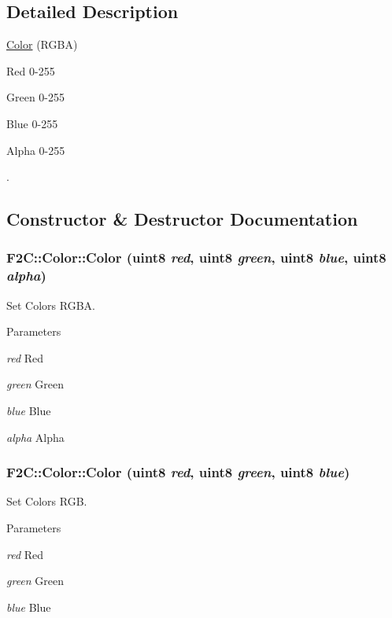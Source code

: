 \subsection{Detailed Description}
\hyperlink{class_f2_c_1_1_color}{Color} (RGBA) \par
 Red 0-\/255 \par
 Green 0-\/255 \par
 Blue 0-\/255 \par
 Alpha 0-\/255 \par
. 

\subsection{Constructor \& Destructor Documentation}
\hypertarget{class_f2_c_1_1_color_ad8f8599fb81eba93868f609a7557ec03}{
\subsubsection[{Color}]{\setlength{\rightskip}{0pt plus 5cm}F2C::Color::Color ({\bf uint8} {\em red}, \/  {\bf uint8} {\em green}, \/  {\bf uint8} {\em blue}, \/  {\bf uint8} {\em alpha})}}
\label{class_f2_c_1_1_color_ad8f8599fb81eba93868f609a7557ec03}


Set Colors RGBA. 
\begin{DoxyParams}{Parameters}
\item[{\em red}]Red \item[{\em green}]Green \item[{\em blue}]Blue \item[{\em alpha}]Alpha \end{DoxyParams}
\hypertarget{class_f2_c_1_1_color_a0e32e8fec1455104a63acf62cffc1891}{
\subsubsection[{Color}]{\setlength{\rightskip}{0pt plus 5cm}F2C::Color::Color ({\bf uint8} {\em red}, \/  {\bf uint8} {\em green}, \/  {\bf uint8} {\em blue})}}
\label{class_f2_c_1_1_color_a0e32e8fec1455104a63acf62cffc1891}


Set Colors RGB. 
\begin{DoxyParams}{Parameters}
\item[{\em red}]Red \item[{\em green}]Green \item[{\em blue}]Blue \end{DoxyParams}


